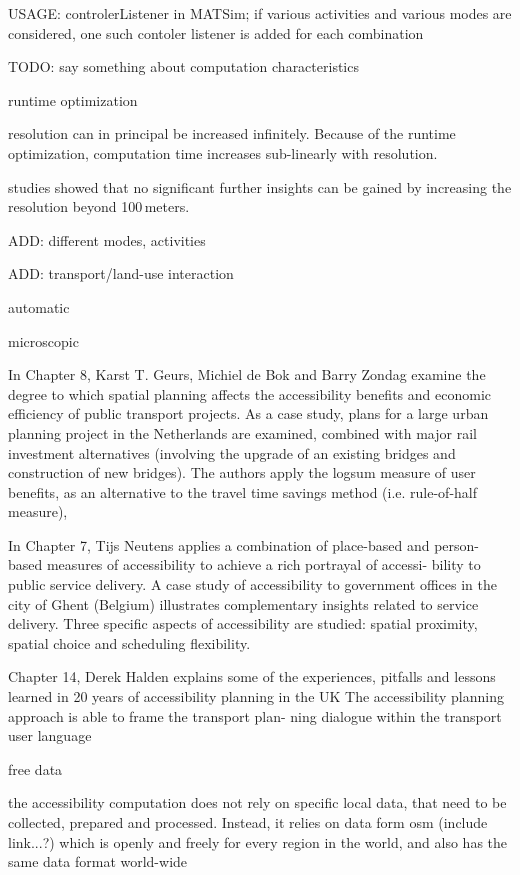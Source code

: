 USAGE: controlerListener in MATSim; if various activities and various modes are considered, one such contoler listener is added for each combination


TODO: say something about computation characteristics

runtime optimization

resolution can in principal be increased infinitely. Because of the runtime optimization, computation time increases sub-linearly with resolution.

studies showed that no significant further insights can be gained by increasing the resolution beyond 100\,meters.

ADD: different modes, activities

ADD: transport/land-use interaction

automatic

microscopic


In Chapter 8, Karst T. Geurs, Michiel de Bok and Barry Zondag examine the degree to which spatial planning affects the accessibility benefits and economic efficiency of public transport projects. As a case study, plans for a large urban planning project in the Netherlands are examined, combined with major rail investment alternatives (involving the upgrade of an existing bridges and construction of new bridges). The authors apply the logsum measure of user benefits, as an alternative to the travel time savings method (i.e. rule-of-half measure),

In Chapter 7, Tijs Neutens applies a combination of place-based and person-based measures of accessibility to achieve a rich portrayal of accessi- bility to public service delivery. A case study of accessibility to government offices in the city of Ghent (Belgium) illustrates complementary insights related to service delivery. Three specific aspects of accessibility are studied: spatial proximity, spatial choice and scheduling flexibility.

Chapter 14, Derek Halden explains some of the experiences, pitfalls and lessons learned in 20 years of accessibility planning in the UK
The accessibility planning approach is able to frame the transport plan- ning dialogue within the transport user language 

free data

the accessibility computation does not rely on specific local data, that need to be collected, prepared and processed. Instead, it relies on data form \gls{osm} (include link...?) which is openly and freely for every region in the world, and also has the same data format world-wide


